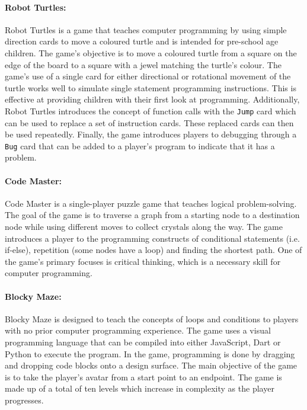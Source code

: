 \paragraph{Robot Turtles:}
Robot Turtles \cite{RobotTurtles} is a game that teaches computer programming by using simple direction cards to move a coloured turtle and is intended for pre-school age children. The game's objective is to move a coloured turtle from a square on the edge of the board to a square with a jewel matching the turtle's colour. The game's use of a single card for either directional or rotational movement of the turtle works well to simulate single statement programming instructions. This is effective at providing children with their first look at programming. Additionally, Robot Turtles introduces the concept of function calls with the \texttt{Jump} card which can be used to replace a set of instruction cards. These replaced cards can then be used repeatedly. Finally, the game introduces players to debugging through a \texttt{Bug} card that can be added to a player's program to indicate that it has a problem.

\paragraph{Code Master:}
Code Master \cite{CodeMaster} is a single-player puzzle game that teaches logical problem-solving. The goal of the game is to traverse a graph from a starting node to a destination node while using different moves to collect crystals along the way. The game introduces a player to the programming constructs of conditional statements (i.e. if-else), repetition (some nodes have a loop) and finding the shortest path. One of the game's primary focuses is critical thinking, which is a necessary skill for computer programming.

\paragraph{Blocky Maze:}
Blocky Maze \cite{Blocklymaze} is designed to teach the concepts of loops and conditions to players with no prior computer programming experience. The game uses a visual programming language that can be compiled into either JavaScript, Dart or Python to execute the program. In the game, programming is done by dragging and dropping code blocks onto a design surface. The main objective of the game is to take the player's avatar from a start point to an endpoint. The game is made up of a total of ten levels which increase in complexity as the player progresses.

